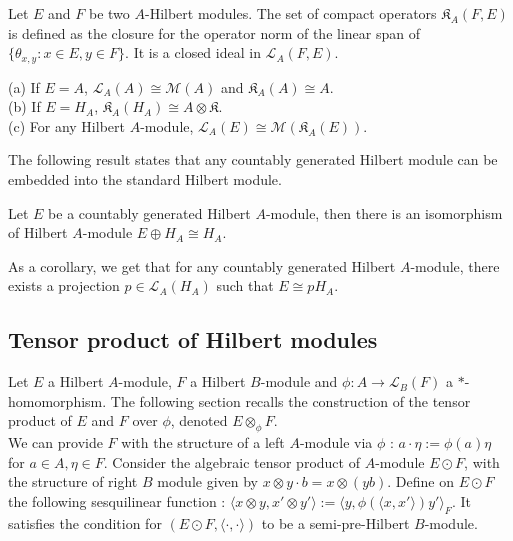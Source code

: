 \begin{definition}
Let $E$ and $F$ be two $A$-Hilbert modules. The set of compact operators $\mathfrak K_A(F,E)$ is defined as the closure for the operator norm of the linear span of $\{\theta_{x,y} : x\in E,y\in F\}$. It is a closed ideal in $\mathcal L_A(F,E)$.\cite{Lance}
\end{definition}

\begin{Expl}
(a) If $E=A$, $\mathcal L_A(A) \cong \mathcal M (A)$ and $\mathfrak K_A(A) \cong A$.\\
(b) If $E=H_A$, $\mathfrak K_A(H_A) \cong A\otimes \mathfrak K$.\\
(c) For any Hilbert $A$-module, $\mathcal L_A(E) \cong \mathcal M(\mathfrak K_A(E))$.
\end{Expl}


The following result states that any countably generated Hilbert module can be embedded into the standard Hilbert module.

\begin{thm}[Stabilization]
Let $E$ be a countably generated Hilbert $A$-module, then there is an isomorphism of Hilbert $A$-module $E\oplus H_A \cong H_A$.
\end{thm}

As a corollary, we get that for any countably generated Hilbert $A$-module, there exists a projection $p\in \mathcal L_A(H_A)$ such that $E\cong p H_A$.

\subsection{Tensor product of Hilbert modules}

Let $E$ a Hilbert $A$-module, $F$ a Hilbert $B$-module and $\phi : A \rightarrow \mathcal L_B(F)$ a $*$-homomorphism. The following section recalls the construction of the tensor product of $E$ and $F$ over $\phi$, denoted $E\otimes_\phi F$.\\

We can provide $F$ with the structure of a left $A$-module via $\phi$ : $a\cdot \eta := \phi(a)\eta$ for $a\in A,\eta\in F$. Consider the algebraic tensor product of $A$-module $E\odot F$, with the structure of right $B$ module given by $x\otimes y \cdot b = x\otimes (yb)$. Define on $E\odot F$ the following sesquilinear function : $\langle x \otimes y , x'\otimes y'\rangle := \langle y, \phi(\langle x, x'\rangle)y'\rangle_F $. It satisfies the condition for $(E\odot F,\langle \cdot , \cdot \rangle )$ to be a semi-pre-Hilbert $B$-module.

